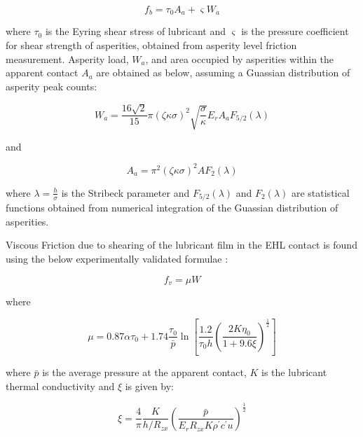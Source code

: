 \begin{equation}\label{Boundary friction experimental}
	f_b=\tau_0 A_a+\varsigma W_a
\end{equation}

where $\tau_0$ is the Eyring shear stress of lubricant and $\varsigma$ is the pressure coefficient for shear strength of asperities, obtained from asperity level friction measurement. Asperity load, $W_a$, and area occupied by asperities within the apparent contact $A_a$ are obtained as below, assuming a Guassian distribution of asperity peak counts: 

\begin{equation}\label{Asperity load}
	W_a=\frac{16 \sqrt{2}}{15} \pi(\zeta \kappa \sigma)^2 \sqrt{\frac{\sigma}{\kappa}} E_r A_a F_{5 / 2}(\lambda)
\end{equation}

and

\begin{equation}\label{Asperity area}
	A_a=\pi^2(\zeta \kappa \sigma)^2 A F_2(\lambda)
\end{equation}

where $\lambda=\frac{h}{\sigma}$ is the Stribeck parameter and $F_{5 / 2}(\lambda)$ and $F_2(\lambda)$ are statistical functions obtained from numerical integration of the Guassian distribution of asperities.  

Viscous Friction due to shearing of the lubricant film in the EHL contact is found using the below experimentally validated formulae \cite{Evans1986}:

\begin{equation}\label{Viscous friction Evans and Johnson}
	f_v=\mu W
\end{equation}

where

\begin{equation}\label{Viscous friction Evans and Johnson mu}
	\mu=0.87 \alpha \tau_0+1.74 \frac{\tau_0}{\bar{p}} \ln \left[\frac{1.2}{\tau_0 h}\left(\frac{2 K \eta_0}{1+9.6 \xi}\right)^{\frac{1}{2}}\right]
\end{equation}

where $\bar{p}$ is the average pressure at the apparent contact, $K$ is the lubricant thermal conductivity and $\xi$ is given by:

\begin{equation}\label{Viscous friction Xi}
	\xi=\frac{4}{\pi} \frac{K}{h / R_{z x}}\left(\frac{\bar{p}}{E_r R_{z x} K \rho^{\prime} c^{\prime} u}\right)^{\frac{1}{2}}
\end{equation}

